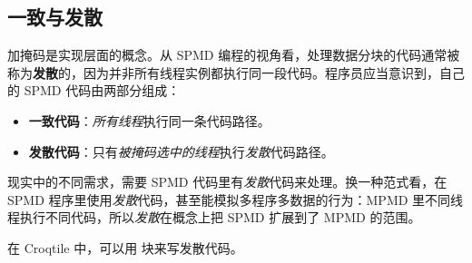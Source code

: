 \subsection*{一致与发散}

加掩码是实现层面的概念。从 SPMD 编程的视角看，处理数据分块的代码通常被称为\textbf{发散}的，因为并非所有线程实例都执行同一段代码。程序员应当意识到，自己的 SPMD 代码由两部分组成：

\begin{itemize}[leftmargin=1.6em]
\item \textbf{一致代码}：\emph{所有线程}执行同一条代码路径。
\item \textbf{发散代码}：只有\emph{被掩码选中的线程}执行\emph{发散}代码路径。
\end{itemize}

现实中的不同需求，需要 SPMD 代码里有\emph{发散}代码来处理。换一种范式看，在 SPMD 程序里使用\emph{发散}代码，甚至能模拟多程序多数据的行为：MPMD 里不同线程执行不同代码，所以\emph{发散}在概念上把 SPMD 扩展到了 MPMD 的范围。

在 Croqtile 中，可以用 \co@inthreads@ 块来写发散代码。
